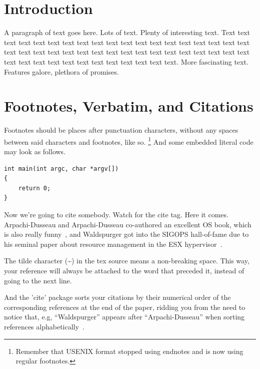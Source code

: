 \section{Introduction}

A paragraph of text goes here. Lots of text. Plenty of interesting
text. Text text text text text text text text text text text text text
text text text text text text text text text text text text text text
text text text text text text text text text text text text text text
text text text text text text text.
More fascinating text. Features galore, plethora of promises.

\section{Footnotes, Verbatim, and Citations}

Footnotes should be places after punctuation characters, without any
spaces between said characters and footnotes, like so.%
\footnote{Remember that USENIX format stopped using endnotes and is
  now using regular footnotes.} And some embedded literal code may
look as follows.

\begin{verbatim}
int main(int argc, char *argv[]) 
{
    return 0;
}
\end{verbatim}

Now we're going to cite somebody. Watch for the cite tag. Here it
comes. Arpachi-Dusseau and Arpachi-Dusseau co-authored an excellent OS
book, which is also really funny~\cite{arpachiDusseau18:osbook}, and
Waldspurger got into the SIGOPS hall-of-fame due to his seminal paper
about resource management in the ESX hypervisor~\cite{waldspurger02}.

The tilde character (\~{}) in the tex source means a non-breaking
space. This way, your reference will always be attached to the word
that preceded it, instead of going to the next line.

And the 'cite' package sorts your citations by their numerical order
of the corresponding references at the end of the paper, ridding you
from the need to notice that, e.g, ``Waldspurger'' appears after
``Arpachi-Dusseau'' when sorting references
alphabetically~\cite{waldspurger02,arpachiDusseau18:osbook}. 

